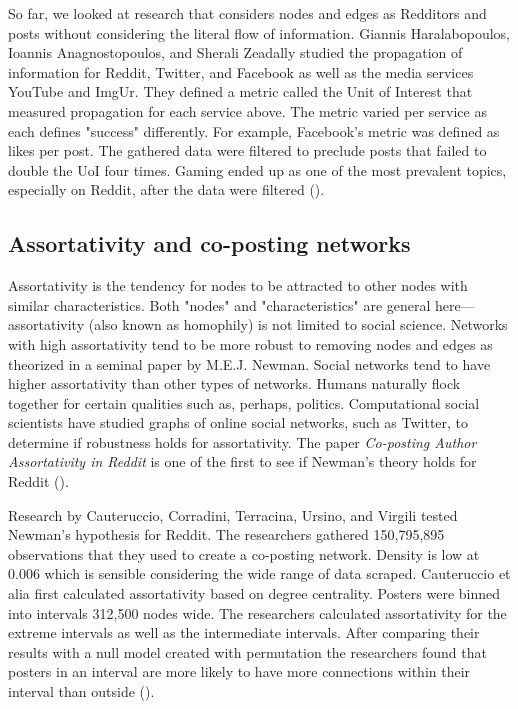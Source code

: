 \documentclass[12pt, a4paper]{article}
\begin{document}
So far, we looked at research that considers nodes and edges as Redditors and posts without considering the literal flow of information. Giannis Haralabopoulos, Ioannis Anagnostopoulos, and Sherali Zeadally studied the propagation of information for Reddit, Twitter, and Facebook as well as the media services YouTube and ImgUr. They defined a metric called the Unit of Interest that measured propagation for each service above. The metric varied per service as each defines "success" differently. For example, Facebook's metric was defined as likes per post. The gathered data were filtered to preclude posts that failed to double the UoI four times. Gaming ended up as one of the most prevalent topics, especially on Reddit, after the data were filtered (\cite{haralabopoulos2015}).

\subsection{Assortativity and co-posting networks}
Assortativity is the tendency for nodes to be attracted to other nodes with similar characteristics. Both "nodes" and "characteristics" are general here---assortativity (also known as homophily) is not limited to social science. Networks with high assortativity tend to be more robust to removing nodes and edges as theorized in a seminal paper by M.E.J. Newman. Social networks tend to have higher assortativity than other types of networks. Humans naturally flock together for certain qualities such as, perhaps, politics. Computational social scientists have studied graphs of online social networks, such as Twitter, to determine if robustness holds for assortativity. The paper \textit{Co-posting Author Assortativity in Reddit} is one of the first to see if Newman's theory holds for Reddit (\cite{cauteruccio2020}).

Research by Cauteruccio, Corradini, Terracina, Ursino, and Virgili tested Newman's hypothesis for Reddit. The researchers gathered 150,795,895 observations that they used to create a co-posting network. Density is low at 0.006 which is sensible considering the wide range of data scraped. Cauteruccio et alia first calculated assortativity based on degree centrality. Posters were binned into intervals 312,500 nodes wide. The researchers calculated assortativity for the extreme intervals as well as the intermediate intervals. After comparing their results with a null model created with permutation the researchers found that posters in an interval are more likely to have more connections within their interval than outside (\cite{cauteruccio2020}). 
\end{document}
